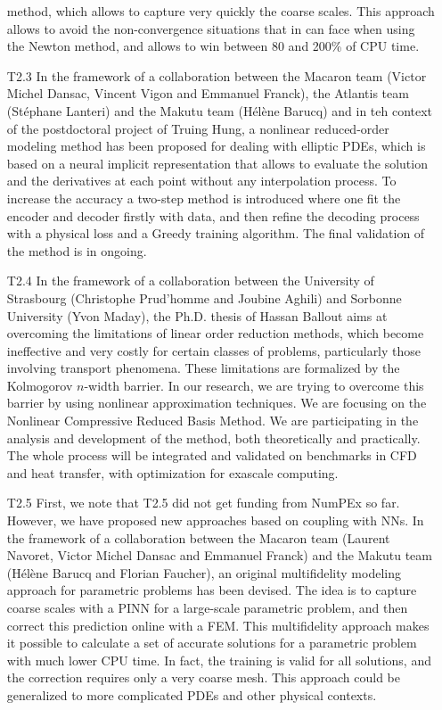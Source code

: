 \begin{itemize}
  method,  which allows  to capture  very quickly  the coarse  scales.
  This approach allows to avoid the non-convergence situations that in
  can face when using the Newton  method, and allows to win between 80
  and 200\% of CPU time.
\item[T2.3] In  the framework of  a collaboration between  the Macaron
  team (Victor Michel Dansac, Vincent  Vigon and Emmanuel Franck), the
  Atlantis  team  (St\'ephane Lanteri)  and  the  Makutu team  (Hélène
  Barucq) and  in teh  context of the  postdoctoral project  of Truing
  Hung, a  nonlinear reduced-order  modeling method has  been proposed
  for dealing with elliptic PDEs, which  is based on a neural implicit
  representation  that  allows  to   evaluate  the  solution  and  the
  derivatives  at each  point without  any interpolation  process.  To
  increase the accuracy a two-step  method is introduced where one fit
  the  encoder and  decoder firstly  with  data, and  then refine  the
  decoding  process  with  a  physical  loss  and  a  Greedy  training
  algorithm. The final validation of the method is in ongoing.
\item[T2.4] In the framework of a collaboration between the University
  of  Strasbourg  (Christophe  Prud’homme   and  Joubine  Aghili)  and
  Sorbonne University (Yvon Maday), the Ph.D. thesis of Hassan Ballout
  aims  at  overcoming  the  limitations  of  linear  order  reduction
  methods,  which  become  ineffective  and very  costly  for  certain
  classes   of  problems,   particularly  those   involving  transport
  phenomena.   These  limitations  are formalized  by  the  Kolmogorov
  $n$-width barrier.  In our research,  we are trying to overcome this
  barrier  by  using  nonlinear   approximation  techniques.   We  are
  focusing on the Nonlinear Compressive  Reduced Basis Method.  We are
  participating in  the analysis and  development of the  method, both
  theoretically and practically. The  whole process will be integrated
  and  validated  on  benchmarks  in   CFD  and  heat  transfer,  with
  optimization for exascale computing.
\item[T2.5] First, we  note that T2.5 did not get  funding from NumPEx
  so far. However,  we have proposed new approaches  based on coupling
  with NNs.  In  the framework of a collaboration  between the Macaron
  team (Laurent Navoret, Victor Michel Dansac and Emmanuel Franck) and
  the Makutu  team (Hélène  Barucq and  Florian Faucher),  an original
  multifidelity  modeling approach  for parametric  problems has  been
  devised.  The  idea is to  capture coarse scales  with a PINN  for a
  large-scale  parametric problem,  and then  correct this  prediction
  online with a FEM.  This multifidelity approach makes it possible to
  calculate a set of accurate  solutions for a parametric problem with
  much  lower CPU  time.   In  fact, the  training  is  valid for  all
  solutions, and the correction requires only a very coarse mesh. This
  approach could  be generalized  to more  complicated PDEs  and other
  physical contexts.
\end{itemize}

